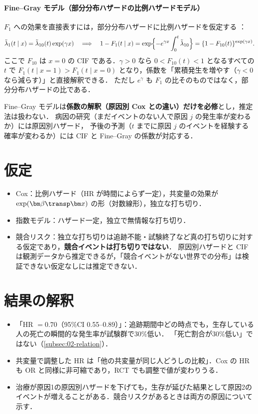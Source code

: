 \paragraph{Fine--Gray モデル（部分分布ハザードの比例ハザードモデル）}
$F_1$ への効果を直接表すには，部分分布ハザードに比例ハザードを仮定する \cite{finegray1999}：
\[
\tilde\lambda_1(t\mid x)=\tilde\lambda_{10}(t)\exp(\gamma x)
\quad\Longrightarrow\quad
1-F_1(t\mid x)=\exp\Bigl\{-e^{\gamma x}\int_0^t\tilde\lambda_{10}\Bigr\}=\{1-F_{10}(t)\}^{\exp(\gamma x)}.
\]
ここで $F_{10}$ は $x=0$ の CIF である．$\gamma>0$ なら $0<F_{10}(t)<1$ となるすべての $t$ で $F_1(t\mid x=1)>F_1(t\mid x=0)$ となり，係数を「累積発生を増やす（$\gamma<0$ なら減らす）」と直接解釈できる．
ただし $e^\gamma$ も $F_1$ の比そのものではなく，部分分布ハザードの比である．
\begin{pointbox}[本書での扱い]
Fine--Gray モデルは\textbf{係数の解釈（原因別 Cox との違い）だけを必修}とし，推定法は扱わない．
病因の研究（まだイベントのない人で原因 $j$ の発生率が変わるか）には原因別ハザード，
予後の予測（$t$ までに原因 $j$ のイベントを経験する確率が変わるか）には CIF と Fine--Gray の係数が対応する．
\end{pointbox}

\section{仮定}\label{sec:10-assump}
\begin{itemize}
\item Cox：比例ハザード（HR が時間によらず一定），共変量の効果が $\exp(\bm\beta\transp\bm x)$ の形（対数線形），独立な打ち切り．
\item 指数モデル：ハザード一定，独立で無情報な打ち切り．
\item 競合リスク：独立な打ち切りは追跡不能・試験終了など真の打ち切りに対する仮定であり，\textbf{競合イベントは打ち切りではない}．
      原因別ハザードと CIF は観測データから推定できるが，「競合イベントがない世界での分布」は検証できない仮定なしには推定できない．
\end{itemize}

\section{結果の解釈}\label{sec:10-interp}
\begin{itemize}
\item 「HR $=0.70$（95\%CI 0.55--0.89）」：追跡期間中どの時点でも，生存している人の死亡の瞬間的な発生率が試験群で30\%低い．
      「死亡割合が30\%低い」ではない（\cref{subsec:02-relation}）．
\item 共変量で調整した HR は「他の共変量が同じ人どうしの比較」．Cox の HR も OR と同様に非可縮であり，RCT でも調整で値が変わりうる．
\item 治療が原因1の原因別ハザードを下げても，生存が延びた結果として原因2のイベントが増えることがある．競合リスクがあるときは両方の原因について示す．
\end{itemize}

